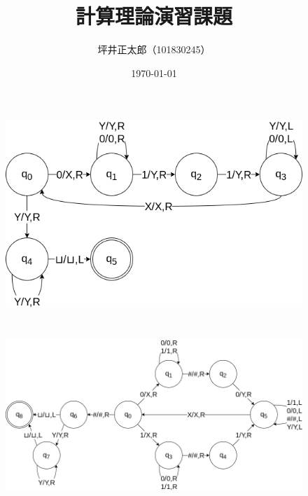 \documentclass[a4paper,10pt]{jsarticle}
\begin{document}
\title{計算理論演習課題}
\author{坪井正太郎（101830245）}
\date{\today}
\maketitle
\section{}

\begin{figure}[H]
  \centering
  \includegraphics[width=\linewidth]{01.drawio.png}
  \caption{}
  \label{}
\end{figure}

\section{}
\begin{figure}[H]
  \centering
  \includegraphics[width=\linewidth]{02.drawio.png}
  \caption{}
  \label{}
\end{figure}
\end{document}

